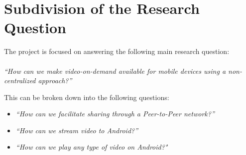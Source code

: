 \section{Subdivision of the Research Question}
The project is focused on answering the following main research question:\\
\\
\textit{``How can we make video-on-demand available for mobile devices using a non-centralized approach?''}

This can be broken down into the following questions:

\begin{itemize}
	\item\textit{``How can we facilitate sharing through a Peer-to-Peer network?''}
	\item\textit{``How can we stream video to Android?''}
	\item\textit{``How can we play any type of video on Android?"}
\end{itemize}
